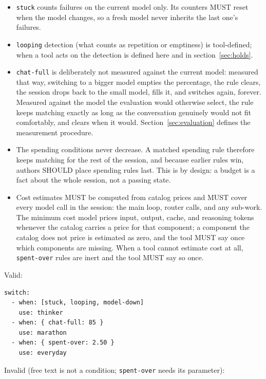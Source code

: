 \documentclass[11pt]{article}
\newcommand{\key}[1]{\texttt{#1}}
\begin{document}
\begin{itemize}
  \item \key{stuck} counts failures on the current model only. Its counters
        MUST reset when the model changes, so a fresh model never inherits the
        last one's failures.
  \item \key{looping} detection (what counts as repetition or emptiness) is
        tool-defined; when a tool acts on the detection is defined here and
        in section~\ref{sec:holds}.
  \item \key{chat-full} is deliberately not measured against the current
        model: measured that way, switching to a bigger model empties the
        percentage, the rule clears, the session drops back to the small
        model, fills it, and switches again, forever. Measured against the
        model the evaluation would otherwise select, the rule keeps matching
        exactly as long as the conversation genuinely would not fit
        comfortably, and clears when it would.
        Section~\ref{sec:evaluation} defines the measurement procedure.
  \item The spending conditions never decrease. A matched spending rule
        therefore keeps matching for the rest of the session, and because
        earlier rules win, authors SHOULD place spending rules last. This is
        by design: a budget is a fact about the whole session, not a passing
        state.
  \item Cost estimates MUST be computed from catalog prices and MUST cover
        every model call in the session: the main loop, router calls, and
        any sub-work. The minimum cost model prices input, output, cache,
        and reasoning tokens whenever the catalog carries a price for that
        component; a component the catalog does not price is estimated as
        zero, and the tool MUST say once which components are missing. When
        a tool cannot estimate cost at all, \key{spent-over} rules are inert
        and the tool MUST say so once.
\end{itemize}

Valid:

\begin{lstlisting}
switch:
  - when: [stuck, looping, model-down]
    use: thinker
  - when: { chat-full: 85 }
    use: marathon
  - when: { spent-over: 2.50 }
    use: everyday
\end{lstlisting}

Invalid (free text is not a condition; \key{spent-over} needs its parameter):
\end{document}

